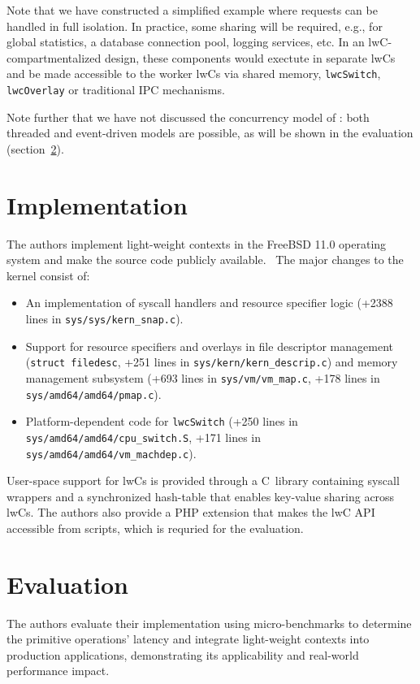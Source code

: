 \documentclass[10pt,twocolumn,letter]{article}
\begin{document}
Note that we have constructed a simplified example where requests can be handled in full isolation.
In practice, some sharing will be required, e.g., for global statistics, a database connection pool, logging services, etc.
In an lwC-compartmentalized design, these components would exectute in separate lwCs and be made accessible to the worker lwCs via shared memory, \lstinline{lwcSwitch}, \lstinline{lwcOverlay} or traditional IPC mechanisms.

Note further that we have not discussed the concurrency model of \appname: both threaded and event-driven models are possible, as will be shown in the evaluation (section~\ref{eval}).


\section{Implementation}\label{impl}

The authors implement light-weight contexts in the FreeBSD 11.0 operating system and make the source code publicly available.~\cite{lwckernelrepo,lwclibsrepo} %
The major changes to the kernel consist of:
\begin{itemize}
  \item An implementation of syscall handlers and resource specifier logic (+2388 lines in \texttt{sys/sys/kern\_snap.c}).
  \item Support for resource specifiers and overlays in
    file descriptor management (\lstinline{struct filedesc}, +251 lines in \texttt{sys/kern/kern\_descrip.c})
    and memory management subsystem  (+693 lines in \texttt{sys/vm/vm\_map.c}, +178 lines in \texttt{sys/amd64/amd64/pmap.c}).
  \item Platform-dependent code for \lstinline{lwcSwitch} (+250 lines in \texttt{sys/amd64/amd64/cpu\_switch.S}, +171 lines in \texttt{sys/amd64/amd64/vm\_machdep.c}).
\end{itemize}

User-space support for lwCs is provided through a C~library containing syscall wrappers and a synchronized hash-table that enables key-value sharing across lwCs.
The authors also provide a PHP extension that makes the lwC API accessible from scripts, which is requried for the evaluation.~\cite{lwclibsrepo}

\section{Evaluation}\label{eval}
The authors evaluate their implementation using micro-benchmarks to determine the primitive operations' latency
and integrate light-weight contexts into production applications, demonstrating its applicability and real-world performance impact.
\end{document}
